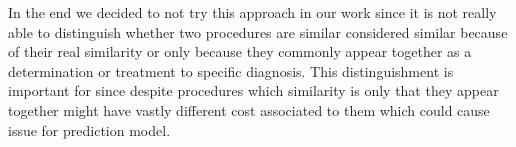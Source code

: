 In the end we decided to not try this approach in our work since it is not really able to distinguish whether two procedures are similar considered similar because of their real similarity or only because they commonly appear together as a determination or treatment to specific diagnosis. This distinguishment is important for since despite procedures which similarity is only that they appear together might have vastly different cost associated to them which could cause issue for prediction model.